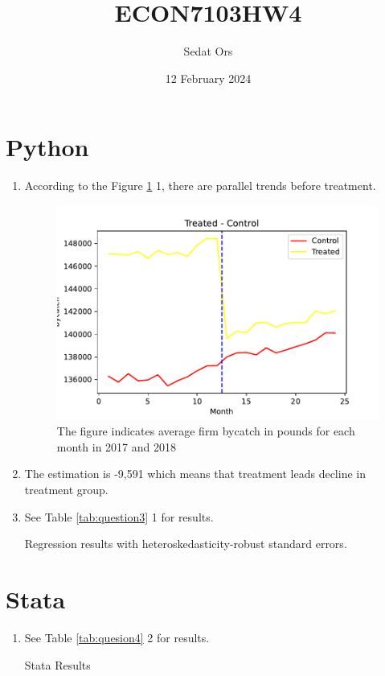 \documentclass{article}
\title{ECON7103HW4}
\author{Sedat Ors}
\date{12 February 2024}
\begin{document}
\maketitle

\section{Python}
\vspace{0.5cm}
\begin{enumerate}
\item 
\noindent According to the Figure \ref{fig:question1} 1, there are parallel trends before treatment. 

\begin{figure}[ht]
    \centering
     \includegraphics{hw4Q1.pdf}
    \caption{The figure indicates average firm bycatch in pounds for each month in 2017 and 2018}
    \label{fig:question1}
\end{figure}

\item The estimation is -9,591 which means that treatment leads decline in treatment group. 

\item
\noindent See Table \ref{tab:question3} 1 for results.
\vspace{0.5cm}
\begin{table}[ht]
    \centering
    
    \caption{Regression results with heteroskedasticity-robust standard errors.}
    \label{tab:question3}
\end{table}


\end{enumerate}

\section{Stata}
\vspace{0.5cm}
\begin{enumerate}
\item
\noindent See Table \ref{tab:quesion4}  2 for results.
\begin{table}[ht]
    \centering
    
    \caption{Stata Results}
    \label{tab:quesion4}
\end{table}

\end{enumerate}
\end{document}
